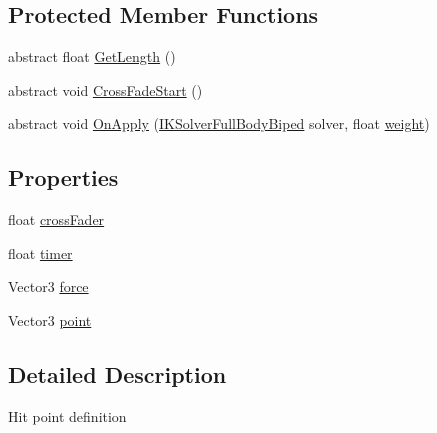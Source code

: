 \subsection*{Protected Member Functions}
\begin{DoxyCompactItemize}
\item 
abstract float \mbox{\hyperlink{class_root_motion_1_1_final_i_k_1_1_hit_reaction_1_1_hit_point_a0d4fe08e2d170bf5c994c5387cd6823c}{Get\+Length}} ()
\item 
abstract void \mbox{\hyperlink{class_root_motion_1_1_final_i_k_1_1_hit_reaction_1_1_hit_point_a56804073dd02e8bf4988b1cb9f7bfaa7}{Cross\+Fade\+Start}} ()
\item 
abstract void \mbox{\hyperlink{class_root_motion_1_1_final_i_k_1_1_hit_reaction_1_1_hit_point_a7d63612de19053ba0ac4f5e4094cc1b7}{On\+Apply}} (\mbox{\hyperlink{class_root_motion_1_1_final_i_k_1_1_i_k_solver_full_body_biped}{I\+K\+Solver\+Full\+Body\+Biped}} solver, float \mbox{\hyperlink{class_root_motion_1_1_final_i_k_1_1_offset_modifier_a3a2cd2134e8a197e6a77b48fcf9aa5d4}{weight}})
\end{DoxyCompactItemize}
\subsection*{Properties}
\begin{DoxyCompactItemize}
\item 
float \mbox{\hyperlink{class_root_motion_1_1_final_i_k_1_1_hit_reaction_1_1_hit_point_a8cadd9b801baa420624e09bb44664648}{cross\+Fader}}
\item 
float \mbox{\hyperlink{class_root_motion_1_1_final_i_k_1_1_hit_reaction_1_1_hit_point_a6f6ebb5967321d40e501ae2229fc94c1}{timer}}
\item 
Vector3 \mbox{\hyperlink{class_root_motion_1_1_final_i_k_1_1_hit_reaction_1_1_hit_point_a2505f1cc74327b1cc9beff520d04992a}{force}}
\item 
Vector3 \mbox{\hyperlink{class_root_motion_1_1_final_i_k_1_1_hit_reaction_1_1_hit_point_ad6c8a087339db0f4f417b042a3fffd92}{point}}
\end{DoxyCompactItemize}


\subsection{Detailed Description}
Hit point definition 



